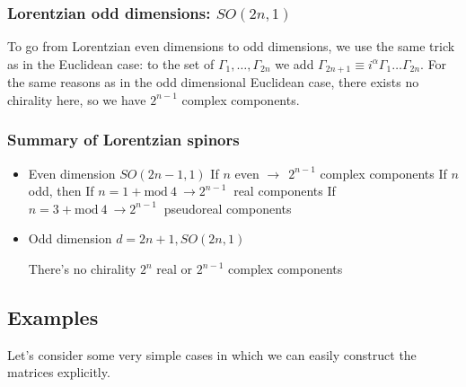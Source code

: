 \documentclass[a4paper,12pt]{article}
\numberwithin{equation}{section}
\numberwithin{exe}{section}
\newcommand{\G}{{\Gamma}}
\begin{document}
\subsubsection{Lorentzian odd dimensions: $SO(2n,1)$}

To go from Lorentzian even dimensions to odd dimensions, we use the same trick as in the Euclidean case: to the set of $\G_1,\hdots,\G_{2n}$ we add $\G_{2n+1}\equiv i^{\alpha} \G_1\hdots\G_{2n}$. For the same reasons as in the odd dimensional Euclidean case, there exists no chirality here, so we have $2^{n-1}$ complex components.

\subsubsection{Summary of Lorentzian spinors} \label{sumLor}


	\begin{itemize}
	\item Even dimension $SO(2n-1,1)$
		\subitem If $n$ even $\rightarrow\ \ 2^{n-1}$ complex components 
		\subitem If $n$ odd, then
			\subsubitem If $n=1+\mbox{mod}\ 4\ \rightarrow 2^{n-1}\ $ real components
			\subsubitem If $n=3+\mbox{mod}\ 4\ \rightarrow 2^{n-1}\ $ pseudoreal components
	\item Odd dimension $d=2n+1, SO(2n,1)$
	
	There's no chirality
		\subitem $2^n$ real or $2^{n-1}$ complex components
	\end{itemize}


\subsection{Examples}\label{examples}

Let's consider some very simple cases in which we can easily construct the matrices explicitly. 
\end{document}
